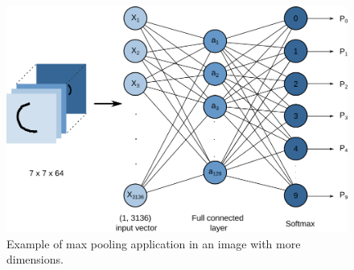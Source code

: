 \begin{figure}
    \centering
    \includegraphics[scale=0.50]{images/figure124.png}
    \caption{Example of max pooling application in an image with more dimensions.}
    \label{fig:figure124}
\end{figure}

